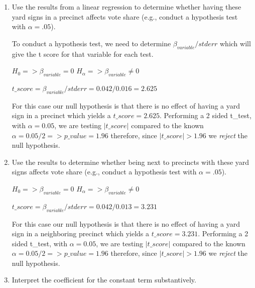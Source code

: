\documentclass[12pt,letterpaper]{article}
\begin{document}
\vspace{.5cm}
\begin{enumerate}
	\item [(a)] Use the results from a linear regression to determine whether having these yard signs in a precinct affects vote share (e.g., conduct a hypothesis test with $\alpha = .05$).
	\vspace{.5cm}

	To conduct a hypothesis test, we need to determine  $ \beta_{variable} / stderr $ which will give the t score for that variable for each test.
	
 $H_{0} =>  \beta_{variable}= 0$ \hspace{1cm}	  $H_{\alpha} =>  \beta_{variable}  \ne  0$
  
  $t\_score = \beta_{variable} / stderr  =  0.042/ 0.016 = 2.625$
  
  For this case  our null hypothesis is that there is no effect of having a yard sign in a precinct which yields a $t\_score = 2.625$.    Performing a 2 sided t\_test, with  $\alpha = 0.05$,  we are testing  $ \left| t\_score \right|  $ 
  compared to the known $\alpha =0.05 /  2 => p\_value = 1.96 $ therefore,  since $ \left| t\_score \right|  > 1.96 $ we \emph{reject}  the null hypothesis.
  
  
	
	\newpage		
	\item [(b)]  Use the results to determine whether being
	next to precincts with these yard signs affects vote
	share (e.g., conduct a hypothesis test with $\alpha = .05$).
	
		\vspace{.5 cm}
	$H_{0} =>  \beta_{variable}= 0$ \hspace{1cm}	 $H_{\alpha} =>  \beta_{variable}  \ne  0$
	
	$t\_score = \beta_{variable} / stderr  =  0.042/ 0.013 = 3.231 $
	
	For this case  our null hypothesis is that there is no effect of having a yard sign in a neighboring precinct which yields a $t\_score = 3.231 $.    Performing  a 2 sided t\_test, with  $\alpha = 0.05$,  we are testing  $ \left| t\_score \right|  $ 
	compared to the known $\alpha =0.05 / 2 => p\_value = 1.96 $ therefore,  since $ \left| t\_score \right|  > 1.96 $ we \emph{reject}  the null hypothesis.
	
	\vspace{.5 cm}
	\item [(c)] Interpret the coefficient for the constant term substantively.
	\vspace{.5cm}


\end{enumerate}
\end{document}
